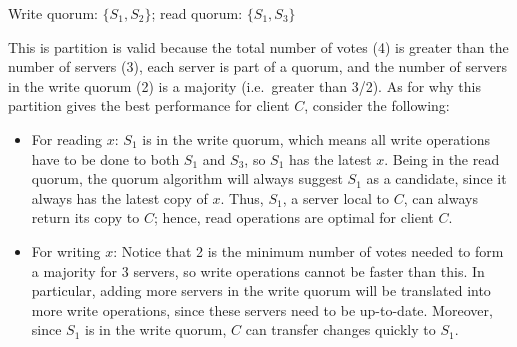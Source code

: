 Write quorum: $\{S_1, S_2\}$; read quorum: $\{S_1,S_3\}$

This is partition is valid because the total number of votes (4) is greater than the number of servers (3), each server is part of a quorum, and the number of servers in the write quorum (2) is a majority (i.e.\ greater than 3/2).
As for why this partition gives the best performance for client $C$, consider the following:
\begin{itemize}
\item
For reading $x$:
$S_1$ is in the write quorum, which means all write operations have to be done to both $S_1$ and $S_3$, so $S_1$ has the latest $x$.
Being in the read quorum, the quorum algorithm will always suggest $S_1$ as a candidate, since it always has the latest copy of $x$.
Thus, $S_1$, a server local to $C$, can always return its copy to $C$;
hence, read operations are optimal for client $C$.
\item
For writing $x$:
Notice that 2 is the minimum number of votes needed to form a majority for 3 servers, so write operations cannot be faster than this.
In particular, adding more servers in the write quorum will be translated into more write operations, since these servers need to be up-to-date.
Moreover, since $S_1$ is in the write quorum, $C$ can transfer changes quickly to $S_1$.
\end{itemize}

